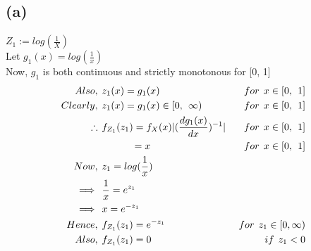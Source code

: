 \documentclass[a4paper,fleqn,11pt]{article}
\theoremstyle{mytheor}
\begin{document}
\subsection*{(a)}
$Z_{1} := log(\frac{1}{X})$ \\
Let $g_{1}(x) = log(\frac{1}{x})$ \\
Now, $g_{1}$ is both continuous and strictly monotonous for [0, 1]
\begin{align*}
Also, \hspace{1ex} & z_{1}(x) = g_{1}(x) \hspace{1ex} & for \hspace{1ex} x \in [0, \hspace{1ex} 1] \\
Clearly, \hspace{1ex} & z_{1}(x) = g_{1}(x) \in [0, \hspace{1ex} \infty) \hspace{1ex} & for \hspace{1ex} x \in [0, \hspace{1ex} 1] \\
\therefore \hspace{1ex} & f_{Z_{1}}(z_{1}) = f_{X} (x) |(\frac{dg_{1} (x)}{dx})^{-1}|\ & for \hspace{1ex} x \in [0, \hspace{1ex} 1] \\
& \hspace{7ex} = x\ & for \hspace{1ex} x \in [0, \hspace{1ex} 1] \\
Now, \hspace{1ex} & z_{1} = log (\frac{1}{x}) \\
\implies \hspace{1ex} & \frac{1}{x} = e^{z_{1}} \\
\implies \hspace{1ex} & x = e^{-z_{1}} \\
Hence, \hspace{1ex} & f_{Z_{1}}(z_{1}) = e^{-z_{1}} \hspace{1ex} & for \hspace{1ex} z_{1} \in [0,\infty) \\
Also, \hspace{1ex} & f_{Z_{1}}(z_{1}) = 0 \hspace{1ex} & if \hspace{1ex} z_{1} < 0
\end{align*}
\end{document}
